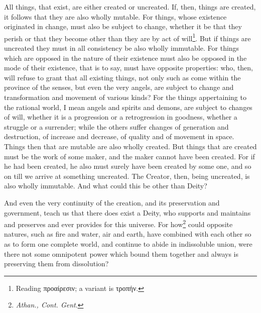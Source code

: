 All things, that exist, are either created or uncreated. If, then, things are created, it follows that they are also wholly mutable. For things, whose existence originated in change, must also be subject to change, whether it be that they perish or that they become other than they are by act of will\footnote{Reading \textgreek{προαίρεσιν}; a variant is \textgreek{τροπήν}.}. But if things are uncreated they must in all consistency be also wholly immutable. For things which are opposed in the nature of their existence must also be opposed in the mode of their existence, that is to say, must have opposite properties: who, then, will refuse to grant that all existing things, not only such as come within the province of the senses, but even the very angels, are subject to change and transformation and movement of various kinds? For the things appertaining to the rational world, I mean angels and spirits and demons, are subject to changes of will, whether it is a progression or a retrogression in goodness, whether a struggle or a surrender; while the others suffer changes of generation and destruction, of increase and decrease, of quality and of movement in space. Things then that are mutable are also wholly created. But things that are created must be the work of some maker, and the maker cannot have been created. For if he had been created, he also must surely have been created by some one, and so on till we arrive at something uncreated. The Creator, then, being uncreated, is also wholly immutable. And what could this be other than Deity?

And even the very continuity of the creation, and its preservation and government, teach us that there does exist a Deity, who supports and maintains and preserves and ever provides for this universe. For how\footnote{\emph{Athan., Cont. Gent}.} could opposite natures, such as fire and water, air and earth, have combined with each other so as to form one complete world, and continue to abide in indissoluble union, were there not some omnipotent power which bound them together and always is preserving them from dissolution?

